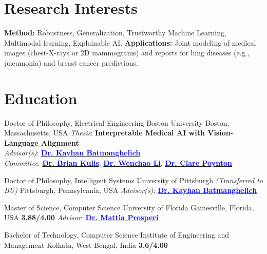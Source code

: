 \section{ Research Interests }
\textbf{Method:} Robustness, Generalization, Trustworthy Machine Learning, Multimodal learning, Explainable AI.
\textbf{Applications:} Joint modeling of medical images (chest-X-rays or 2D mammograms) and reports for lung diseases (e.g., pneumonia) and breast cancer predictions.

\section{ Education }
      {Doctor of Philosophy, Electrical Engineering}%
      {Boston University}%
      {Boston, Massachusetts, USA}%
      {}%
      {
        \textit{Thesis}: \textbf{Interpretable Medical AI with Vision-Language Alignment}
        \\
        \textit{Advisor(s)}:
        {\href{https://www.batman-lab.com/}
        { \textbf{\textcolor{blue}{Dr. Kayhan Batmanghelich}}}}
        \\
        \textit{Committee}:
        {\href{https://people.bu.edu/bkulis/}{\textbf{\textcolor{blue}{Dr. Brian Kulis}}}},
        {\href{https://sites.bu.edu/depend/people/}{\textbf{\textcolor{blue}{Dr. Wenchao Li}}}},
        {\href{https://www.bu.edu/hic/profile/clare-poynton/}{\textbf{\textcolor{blue}{Dr. Clare Poynton}}}}
      }

      {Doctor of Philosophy, Intelligent Systems}%
      {University of Pittsburgh \emph{(Transferred to BU)}}%
      {Pittsburgh, Pennsylvania, USA}%
      {}%
      {
        \textit{Advisor(s)}:
        {\href{https://www.batman-lab.com/}
        { \textbf{\textcolor{blue}{Dr. Kayhan Batmanghelich}}}}
      }

      {Master of Science, Computer Science}%
      {University of Florida}%
      {Gainesville, Florida, USA}%
      {\textbf{3.88/4.00}}%
      {}%
      {
        \textit{Advisor}: {\href{https://epidemiology.phhp.ufl.edu/disl/}
        { \textbf{\textcolor{blue}{Dr. Mattia Prosperi}}}}
      }
      
      {Bachelor of Technology, Computer Science}%
      {Institute of Engineering and Management}%
      {Kolkata, West Bengal, India}%
      {\textbf{3.6/4.00}}%
      {}%
